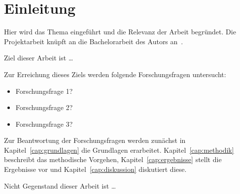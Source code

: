 \section{Einleitung}
\label{cap:einleitung}

Hier wird das Thema eingeführt und die Relevanz der Arbeit begründet.
Die Projektarbeit knüpft an die Bachelorarbeit des Autors an~\cite{bachelorarbeit}.

Ziel dieser Arbeit ist \dots

Zur Erreichung dieses Ziels werden folgende Forschungsfragen untersucht:
\begin{itemize}
	\item Forschungsfrage 1?
	\item Forschungsfrage 2?
	\item Forschungsfrage 3?
\end{itemize}

\medskip

Zur Beantwortung der Forschungsfragen werden zunächst in Kapitel~\ref{cap:grundlagen} die Grundlagen erarbeitet.
Kapitel~\ref{cap:methodik} beschreibt das methodische Vorgehen, Kapitel~\ref{cap:ergebnisse} stellt die Ergebnisse vor und Kapitel~\ref{cap:diskussion} diskutiert diese.

Nicht Gegenstand dieser Arbeit ist \dots
